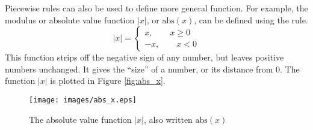 \documentclass[11pt,a4paper,titlepage,oneside,openany]{article}
\begin{document}
Piecewise rules can also be used to define more general function. For example, the modulus or absolute value function $|x|$, or $\text{abs}(x)$, can be defined using the rule.
\begin{equation*}
  |x| =
  \begin{cases}
    x, \qquad x \ge 0\\
    -x, \qquad x<0
  \end{cases}
\end{equation*}
This function strips off the negative sign of any number, but leaves positive numbers unchanged. It gives the ``size'' of a number, or its distance from $0$. The function $|x|$ is plotted in Figure \vref{fig:abs_x}.

\begin{figure}
  \centering
  \texttt{[image: images/abs\_x.eps]}
  \caption{The absolute value function $|x|$, also written $\text{abs}(x)$}
  \label{fig:abs_x}
\end{figure}
\end{document}
